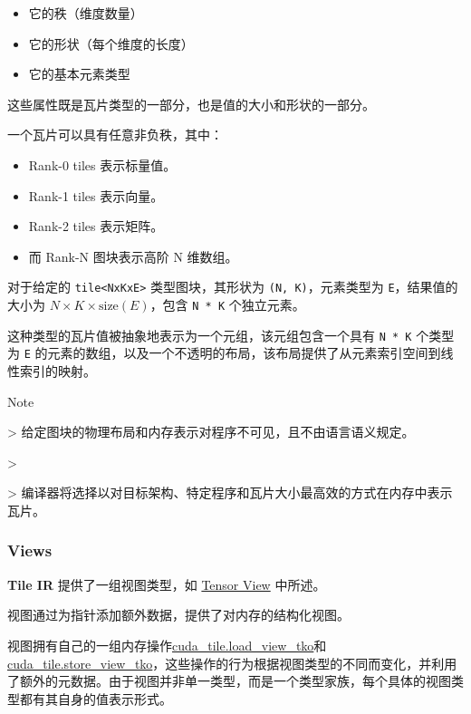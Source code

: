 \documentclass{article}
\begin{document}
\begin{itemize}
\item 它的秩（维度数量）
\item 它的形状（每个维度的长度）
\item 它的基本元素类型

\end{itemize}
这些属性既是瓦片类型的一部分，也是值的大小和形状的一部分。


一个瓦片可以具有任意非负秩，其中：

\begin{itemize}
\item Rank-0 tiles 表示标量值。
\item Rank-1 tiles 表示向量。
\item Rank-2 tiles 表示矩阵。
\item 而 Rank-N 图块表示高阶 N 维数组。

\end{itemize}
对于给定的 \texttt{tile<NxKxE>} 类型图块，其形状为 \texttt{(N, K)}，元素类型为 \texttt{E}，结果值的大小为 $N × K × \mathrm{size}(E)$，包含 \texttt{N * K} 个独立元素。


这种类型的瓦片值被抽象地表示为一个元组，该元组包含一个具有 \texttt{N * K} 个类型为 \texttt{E} 的元素的数组，以及一个不透明的布局，该布局提供了从元素索引空间到线性索引的映射。


Note

> 给定图块的物理布局和内存表示对程序不可见，且不由语言语义规定。

> 

> 编译器将选择以对目标架构、特定程序和瓦片大小最高效的方式在内存中表示瓦片。



\subsubsection{Views}

\textbf{Tile IR} 提供了一组视图类型，如 \href{https://docs.nvidia.com/cuda/tile-ir/latest/sections/types.html#type-views}{Tensor View} 中所述。


视图通过为指针添加额外数据，提供了对内存的结构化视图。

视图拥有自己的一组内存操作\href{https://docs.nvidia.com/cuda/tile-ir/latest/sections/operations.html#op-cuda-tile-load-view-tko}{cuda\_tile.load\_view\_tko}和\href{https://docs.nvidia.com/cuda/tile-ir/latest/sections/operations.html#op-cuda-tile-store-view-tko}{cuda\_tile.store\_view\_tko}，这些操作的行为根据视图类型的不同而变化，并利用了额外的元数据。由于视图并非单一类型，而是一个类型家族，每个具体的视图类型都有其自身的值表示形式。
\end{document}
